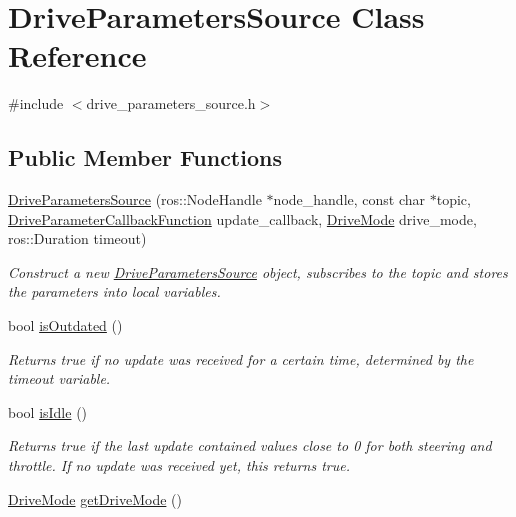 \hypertarget{class_drive_parameters_source}{}\section{Drive\+Parameters\+Source Class Reference}
\label{class_drive_parameters_source}


{\ttfamily \#include $<$drive\+\_\+parameters\+\_\+source.\+h$>$}

\subsection*{Public Member Functions}
\begin{DoxyCompactItemize}
\item 
\hyperlink{class_drive_parameters_source_a4854d2f3c78f8426d267028cd6491a4e}{Drive\+Parameters\+Source} (ros\+::\+Node\+Handle $\ast$node\+\_\+handle, const char $\ast$topic, \hyperlink{drive__parameters__source_8h_a87328cd02ddd6c83ff6d4943cf8a93c2}{Drive\+Parameter\+Callback\+Function} update\+\_\+callback, \hyperlink{drive__mode_8h_a4430ce18ab45f139e6843ac0811fda83}{Drive\+Mode} drive\+\_\+mode, ros\+::\+Duration timeout)
\begin{DoxyCompactList}\small\item\em Construct a new \hyperlink{class_drive_parameters_source}{Drive\+Parameters\+Source} object, subscribes to the topic and stores the parameters into local variables. \end{DoxyCompactList}\item 
bool \hyperlink{class_drive_parameters_source_a19ac7507bffaa6167393d24fe5f7f67e}{is\+Outdated} ()
\begin{DoxyCompactList}\small\item\em Returns true if no update was received for a certain time, determined by the timeout variable. \end{DoxyCompactList}\item 
bool \hyperlink{class_drive_parameters_source_a716e9da760080cdc8d0e69553932c789}{is\+Idle} ()
\begin{DoxyCompactList}\small\item\em Returns true if the last update contained values close to 0 for both steering and throttle. If no update was received yet, this returns true. \end{DoxyCompactList}\item 
\hyperlink{drive__mode_8h_a4430ce18ab45f139e6843ac0811fda83}{Drive\+Mode} \hyperlink{class_drive_parameters_source_a4a75910ac804b72f54f268edf5bfee80}{get\+Drive\+Mode} ()
\end{DoxyCompactItemize}


